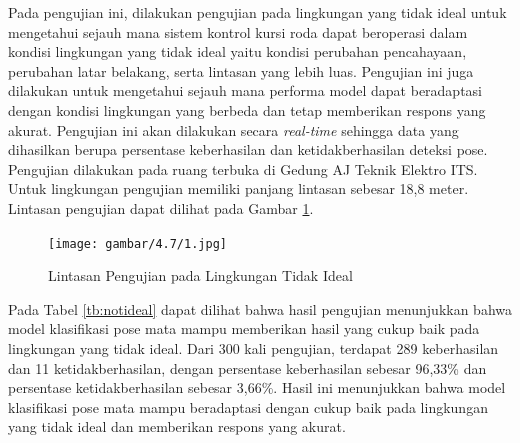 Pada pengujian ini, dilakukan pengujian pada lingkungan yang tidak ideal untuk mengetahui sejauh mana sistem kontrol kursi roda dapat beroperasi dalam kondisi lingkungan yang tidak ideal yaitu kondisi perubahan pencahayaan, perubahan latar belakang, serta lintasan yang lebih luas. Pengujian ini juga dilakukan untuk mengetahui sejauh mana performa model dapat beradaptasi dengan kondisi lingkungan yang berbeda dan tetap memberikan respons yang akurat. Pengujian ini akan dilakukan secara \emph{real-time} sehingga data yang dihasilkan berupa persentase keberhasilan dan ketidakberhasilan deteksi pose. Pengujian dilakukan pada ruang terbuka di Gedung AJ Teknik Elektro ITS. Untuk lingkungan pengujian memiliki panjang lintasan sebesar 18,8 meter. Lintasan pengujian dapat dilihat pada Gambar \ref{fig:trek}.

\begin{figure} [H] \centering
  \texttt{[image: gambar/4.7/1.jpg]}
  \caption{Lintasan Pengujian pada Lingkungan Tidak Ideal}
  \label{fig:trek}
\end{figure}

Pada Tabel \ref{tb:notideal} dapat dilihat bahwa hasil pengujian menunjukkan bahwa model klasifikasi pose mata mampu memberikan hasil yang cukup baik pada lingkungan yang tidak ideal. Dari 300 kali pengujian, terdapat 289 keberhasilan dan 11 ketidakberhasilan, dengan persentase keberhasilan sebesar 96,33\% dan persentase ketidakberhasilan sebesar 3,66\%. Hasil ini menunjukkan bahwa model klasifikasi pose mata mampu beradaptasi dengan cukup baik pada lingkungan yang tidak ideal dan memberikan respons yang akurat.

